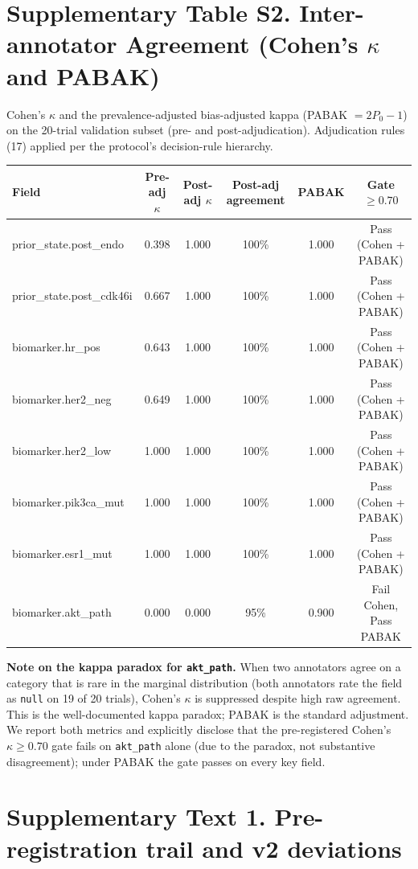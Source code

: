\documentclass[11pt,a4paper]{article}
\begin{document}
\section*{Supplementary Table S2. Inter-annotator Agreement (Cohen's $\kappa$ and PABAK)}

Cohen's $\kappa$ and the prevalence-adjusted bias-adjusted kappa (PABAK $= 2P_0 - 1$) on the 20-trial validation subset (pre- and post-adjudication). Adjudication rules (17) applied per the protocol's decision-rule hierarchy.

\begin{tabular}{lccccc}
\toprule
Field & Pre-adj $\kappa$ & Post-adj $\kappa$ & Post-adj agreement & PABAK & Gate $\ge 0.70$ \\
\midrule
prior\_state.post\_endo      & 0.398 & 1.000 & 100\% & 1.000 & Pass (Cohen + PABAK) \\
prior\_state.post\_cdk46i    & 0.667 & 1.000 & 100\% & 1.000 & Pass (Cohen + PABAK) \\
biomarker.hr\_pos            & 0.643 & 1.000 & 100\% & 1.000 & Pass (Cohen + PABAK) \\
biomarker.her2\_neg          & 0.649 & 1.000 & 100\% & 1.000 & Pass (Cohen + PABAK) \\
biomarker.her2\_low          & 1.000 & 1.000 & 100\% & 1.000 & Pass (Cohen + PABAK) \\
biomarker.pik3ca\_mut        & 1.000 & 1.000 & 100\% & 1.000 & Pass (Cohen + PABAK) \\
biomarker.esr1\_mut          & 1.000 & 1.000 & 100\% & 1.000 & Pass (Cohen + PABAK) \\
biomarker.akt\_path          & 0.000 & 0.000 &  95\% & 0.900 & Fail Cohen, Pass PABAK \\
\bottomrule
\end{tabular}

\textbf{Note on the kappa paradox for \texttt{akt\_path}.} When two annotators agree on a category that is rare in the marginal distribution (both annotators rate the field as \texttt{null} on 19 of 20 trials), Cohen's $\kappa$ is suppressed despite high raw agreement. This is the well-documented kappa paradox; PABAK is the standard adjustment. We report both metrics and explicitly disclose that the pre-registered Cohen's $\kappa \ge 0.70$ gate fails on \texttt{akt\_path} alone (due to the paradox, not substantive disagreement); under PABAK the gate passes on every key field.

\section*{Supplementary Text 1. Pre-registration trail and v2 deviations}
\end{document}

